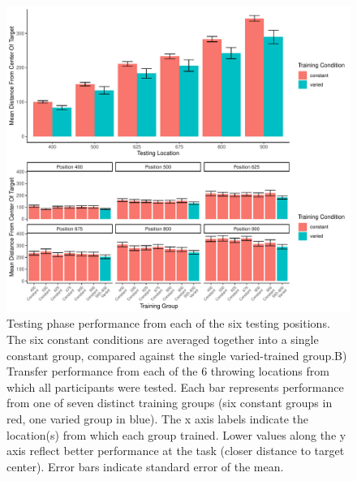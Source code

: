 \documentclass[
  man,floatsintext]{apa7}
\begin{document}
\begin{figure}
\centering
\includegraphics{IGAS_PJ_files/figure-latex/e2test1-1.pdf}
\caption{\label{fig:e2test1}Testing phase performance from each of the six testing positions. The six constant conditions are averaged together into a single constant group, compared against the single varied-trained group.B) Transfer performance from each of the 6 throwing locations from which all participants were tested. Each bar represents performance from one of seven distinct training groups (six constant groups in red, one varied group in blue). The x axis labels indicate the location(s) from which each group trained. Lower values along the y axis reflect better performance at the task (closer distance to target center). Error bars indicate standard error of the mean.}
\end{figure}
\end{document}
